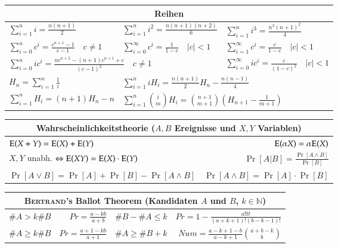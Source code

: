 \begin{tabular}{l|l|l}
	\toprule
	\multicolumn{3}{c}{Reihen} \\
	\midrule
	$\sum\limits_{i = 1}^n i = \frac{n(n+1)}{2}$ &
	$\sum\limits_{i = 1}^n i^2 = \frac{n(n + 1)(n + 2)}{6}$ & 
	$\sum\limits_{i = 1}^n i^3 = \frac{n^2 (n + 1)^2}{4}$ \\

	$\sum\limits_{i = 0}^n c^i = \frac{c^{n + 1} - 1}{c - 1} \quad c \neq 1$ &
	$\sum\limits_{i = 0}^\infty c^i = \frac{1}{1 - c} \quad \vert c \vert < 1$ &
	$\sum\limits_{i = 1}^\infty c^i = \frac{c}{1 - c} \quad \vert c \vert < 1$ \\

	\multicolumn{2}{l|}{
		$\sum\limits_{i = 0}^n ic^i = \frac{nc^{n + 2} - (n + 1)c^{n + 1} + c}{(c - 1)^2} \quad c \neq 1$
	} &
	$\sum\limits_{i = 0}^\infty ic^i = \frac{c}{(1 - c)^2} \quad \vert c \vert < 1$ \\

	$H_n = \sum\limits_{i = 1}^n \frac{1}{i}$ &
	\multicolumn{2}{l}{
		$\sum\limits_{i = 1}^n iH_i = \frac{n(n + 1)}{2}H_n - \frac{n(n - 1)}{4}$
	} \\

	$\sum\limits_{i = 1}^n H_i = (n + 1)H_n - n$ &
	\multicolumn{2}{l}{
		$\sum\limits_{i = 1}^n \binom{i}{m}H_i =
		\binom{n + 1}{m + 1} \left(H_{n + 1} - \frac{1}{m  + 1}\right)$
	} \\
	\bottomrule
\end{tabular}
\vspace{5mm}

\begin{tabular}{l|r}
	\toprule
	\multicolumn{2}{c}{
		Wahrscheinlichkeitstheorie ($A,B$ Ereignisse und $X,Y$ Variablen)
	} \\
	\midrule
	$\text{E}(X + Y) = \text{E}(X) + \text{E}(Y)$ &
	$\text{E}(\alpha X) = \alpha \text{E}(X)$ \\

	$X, Y$ unabh. $\Leftrightarrow \text{E}(XY) = \text{E}(X) \cdot \text{E}(Y)$ &
	$\Pr[A \vert B] = \frac{\Pr[A \land B]}{\Pr[B]}$ \\

	$\Pr[A \lor B] = \Pr[A] + \Pr[B] - \Pr[A \land B]$ &
	$\Pr[A \land B] = \Pr[A] \cdot \Pr[B]$ \\
	\bottomrule
\end{tabular}
\vspace{5mm}

\begin{tabular}{lr|lr}
	\toprule
	\multicolumn{4}{c}{\textsc{Bertrand}'s Ballot Theorem (Kandidaten $A$ und $B$, $k \in \mathbb{N}$)} \\
	\midrule
	$\#A > k\#B$ & $Pr = \frac{a - kb}{a + b}$ &
	$\#B - \#A \leq k$ & $Pr = 1 - \frac{a!b!}{(a + k + 1)!(b - k - 1)!}$ \\

	$\#A \geq k\#B$ & $Pr = \frac{a + 1 - kb}{a + 1}$ &
	$\#A \geq \#B + k$ & $Num = \frac{a - k + 1 - b}{a - k + 1} \binom{a + b - k}{b}$ \\
	\bottomrule
\end{tabular}

